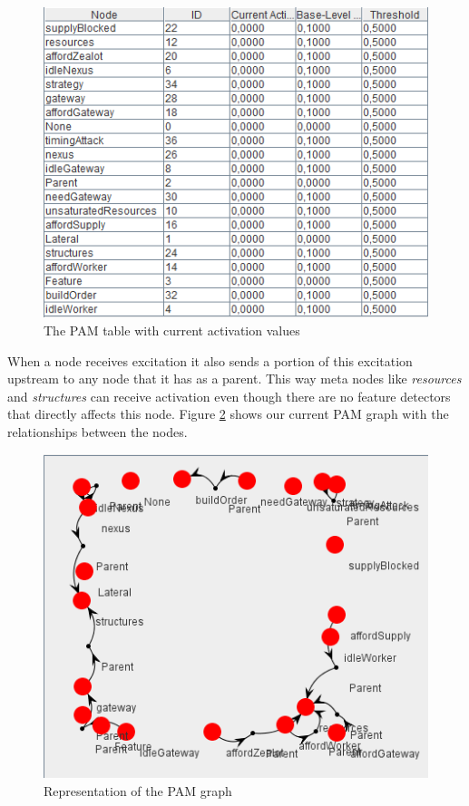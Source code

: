 \begin{figure}[h!tb]
\centering
\includegraphics[scale=1.0]{graphics/pam_table.png}
\caption{The PAM table with current activation values}
\label{fig:pamtable}
\end{figure}

When a node receives excitation it also sends a portion of this excitation upstream to any node that it has as a parent. This way meta nodes like {\em resources} and {\em structures} can receive activation even though there are no feature detectors that directly affects this node. Figure \ref{fig:pamgraph} shows our current PAM graph with the relationships  between the nodes. 

\begin{figure}[h!tb]
\centering
\includegraphics[scale=1.0]{graphics/pam_graph.png}
\caption{Representation of the PAM graph}
\label{fig:pamgraph}
\end{figure}


